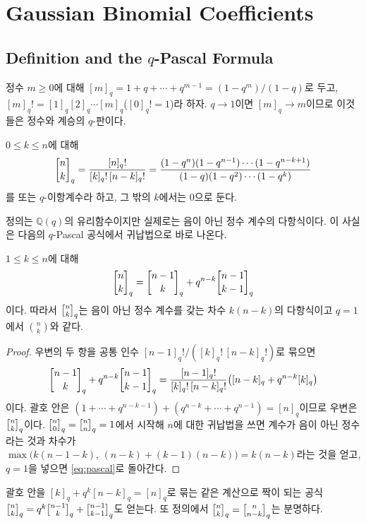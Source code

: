 \section{Gaussian Binomial Coefficients}
\label{sec:qbinom}

\subsection{Definition and the $q$-Pascal Formula}

정수 $m\ge0$에 대해 $[m]_q=1+q+\cdots+q^{m-1}=(1-q^m)/(1-q)$로 두고, $[m]_q!=[1]_q[2]_q\cdots[m]_q$($[0]_q!=1$)라 하자. $q\to1$이면 $[m]_q\to m$이므로 이것들은 정수와 계승의 $q$-판이다.

\begin{definition}
\label{def:qbinom}
$0\le k\le n$에 대해
\[
\qbinom nk=\frac{[n]_q!}{[k]_q!\,[n-k]_q!}=\frac{(1-q^n)(1-q^{n-1})\cdots(1-q^{n-k+1})}{(1-q)(1-q^2)\cdots(1-q^k)}
\]
를  또는 $q$-이항계수라 하고, 그 밖의 $k$에서는 $0$으로 둔다.
\end{definition}

정의는 $\mathbb Q(q)$의 유리함수이지만 실제로는 음이 아닌 정수 계수의 다항식이다. 이 사실은 다음의 $q$-Pascal 공식에서 귀납법으로 바로 나온다.

\begin{proposition}
\label{prop:qpascal}
$1\le k\le n$에 대해
\begin{equation}
\label{eq:qpascal}
\qbinom nk=\qbinom{n-1}k+q^{n-k}\qbinom{n-1}{k-1}
\end{equation}
이다. 따라서 $\qbinom nk$는 음이 아닌 정수 계수를 갖는 차수 $k(n-k)$의 다항식이고 $q=1$에서 $\binom nk$와 같다.
\end{proposition}

\begin{proof}
우변의 두 항을 공통 인수 $[n-1]_q!/([k]_q!\,[n-k]_q!)$로 묶으면
\[
\qbinom{n-1}k+q^{n-k}\qbinom{n-1}{k-1}=\frac{[n-1]_q!}{[k]_q!\,[n-k]_q!}\bigl([n-k]_q+q^{n-k}[k]_q\bigr)
\]
이다. 괄호 안은 $(1+\cdots+q^{n-k-1})+(q^{n-k}+\cdots+q^{n-1})=[n]_q$이므로 우변은 $\qbinom nk$이다. $\qbinom n0=\qbinom nn=1$에서 시작해 $n$에 대한 귀납법을 쓰면 계수가 음이 아닌 정수라는 것과 차수가 $\max\bigl(k(n-1-k),\,(n-k)+(k-1)(n-k)\bigr)=k(n-k)$라는 것을 얻고, $q=1$을 넣으면 \cref{eq:pascal}로 돌아간다.
\end{proof}

괄호 안을 $[k]_q+q^k[n-k]_q=[n]_q$로 묶는 같은 계산으로 짝이 되는 공식 $\qbinom nk=q^k\qbinom{n-1}k+\qbinom{n-1}{k-1}$도 얻는다. 또 정의에서 $\qbinom nk=\qbinom n{n-k}$는 분명하다.

